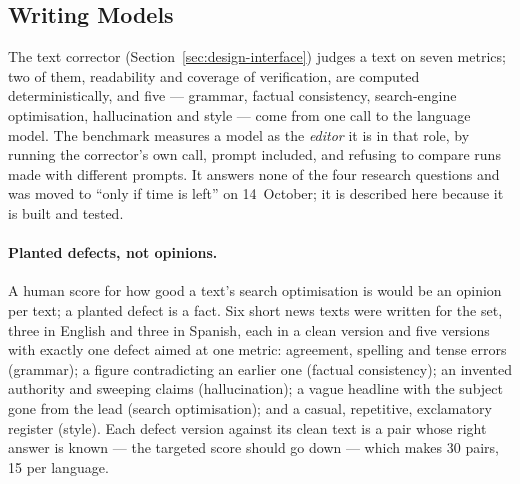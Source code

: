 
\subsection{Writing Models}
\label{subsec:benchmark-writing}

The text corrector (Section~\ref{sec:design-interface}) judges a text on
seven metrics; two of them, readability and coverage of verification,
are computed deterministically, and five --- grammar, factual
consistency, search-engine optimisation, hallucination and style --- come
from one call to the language model. The benchmark measures a model as
the \emph{editor} it is in that role, by running the corrector's own
call, prompt included, and refusing to compare runs made with different
prompts. It answers none of the four research questions and was moved
to ``only if time is left'' on 14~October; it is described here because
it is built and tested.

\paragraph{Planted defects, not opinions.} A human score for how good a
text's search optimisation is would be an opinion per text; a planted
defect is a fact. Six short news texts were written for the set, three
in English and three in Spanish, each in a clean version and five
versions with exactly one defect aimed at one metric: agreement,
spelling and tense errors (grammar); a figure contradicting an earlier
one (factual consistency); an invented authority and sweeping claims
(hallucination); a vague headline with the subject gone from the lead
(search optimisation); and a casual, repetitive, exclamatory register
(style). Each defect version against its clean text is a pair whose
right answer is known --- the targeted score should go down --- which
makes 30 pairs, 15 per language.

